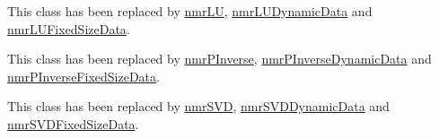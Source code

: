 
\begin{DoxyRefList}
\item[\label{deprecated__deprecated000001}%
\hypertarget{deprecated__deprecated000001}{}%
Class \hyperlink{classnmr_l_u_solver}{nmr\+L\+U\+Solver} ]This class has been replaced by \hyperlink{nmr_l_u_8h_a66bf403c705953a781e940cf1b674d5f}{nmr\+L\+U}, \hyperlink{classnmr_l_u_dynamic_data}{nmr\+L\+U\+Dynamic\+Data} and \hyperlink{classnmr_l_u_fixed_size_data}{nmr\+L\+U\+Fixed\+Size\+Data}.  
\item[\label{deprecated__deprecated000002}%
\hypertarget{deprecated__deprecated000002}{}%
Class \hyperlink{classnmr_p_inverse_solver}{nmr\+P\+Inverse\+Solver} ]This class has been replaced by \hyperlink{nmr_p_inverse_8h_a0694f8540c064c2aa6d8dbe488238462}{nmr\+P\+Inverse}, \hyperlink{classnmr_p_inverse_dynamic_data}{nmr\+P\+Inverse\+Dynamic\+Data} and \hyperlink{classnmr_p_inverse_fixed_size_data}{nmr\+P\+Inverse\+Fixed\+Size\+Data}.  
\item[\label{deprecated__deprecated000003}%
\hypertarget{deprecated__deprecated000003}{}%
Class \hyperlink{classnmr_s_v_d_solver}{nmr\+S\+V\+D\+Solver} ]This class has been replaced by \hyperlink{nmr_s_v_d_8h_a52115d0e7a485c4494aa20f4f3f4ebe7}{nmr\+S\+V\+D}, \hyperlink{classnmr_s_v_d_dynamic_data}{nmr\+S\+V\+D\+Dynamic\+Data} and \hyperlink{classnmr_s_v_d_fixed_size_data}{nmr\+S\+V\+D\+Fixed\+Size\+Data}. 
\end{DoxyRefList}